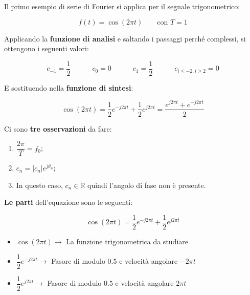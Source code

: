 \documentclass[a4paper]{article}
\begin{document}
	\noindent
	Il primo esempio di serie di Fourier si applica per il segnale trigonometrico:
	
	\begin{equation*}
		f\left(t\right) = \cos\left(2 \pi t\right) \hspace{2em} \text{con } T = 1
	\end{equation*}

	\noindent
	Applicando la \textbf{funzione di analisi} e saltando i passaggi perché complessi, si ottengono i seguenti valori:
	
	\begin{equation*}
		c_{-1} = \dfrac{1}{2} \hspace{3em}
		c_{0} = 0 \hspace{3em}
		c_{1} = \dfrac{1}{2} \hspace{3em}
		c_{i \le -2, i \ge 2} = 0
	\end{equation*}

	\noindent
	E sostituendo nella \textbf{funzione di sintesi}:
	
	\begin{equation*}
		\cos\left(2 \pi t\right) = \dfrac{1}{2} e^{-j 2 \pi t} + \dfrac{1}{2} e^{j 2 \pi t} = \dfrac{e^{j 2 \pi t} + e^{-j 2 \pi t}}{2}
	\end{equation*}

	\noindent
	Ci sono \textbf{tre osservazioni} da fare:
	
	\begin{enumerate}[label=\Roman*.]
		\item $\dfrac{2\pi}{T} = f_{0}$;
		
		\item $c_{n} = |c_{n}| e^{j\theta_{n}}$;
		
		\item In questo caso, $c_{n} \in \mathbb{R}$ quindi l'angolo di fase non è presente.
	\end{enumerate}

	\noindent
	\textbf{Le parti} dell'equazione sono le seguenti:
	
	\begin{equation*}
		\cos{\left(2 \pi t\right)} = \dfrac{1}{2} e^{-j 2 \pi t} + \dfrac{1}{2} e^{j 2 \pi t}
	\end{equation*}

	\begin{itemize}[label=]
		\item $\cos{\left(2 \pi t\right)} \rightarrow$ La funzione trigonometrica da studiare
		
		\item $\dfrac{1}{2} e^{-j 2 \pi t} \rightarrow$ Fasore di modulo $0.5$ e velocità angolare $-2\pi t$
		
		\item $\dfrac{1}{2} e^{j 2 \pi t} \rightarrow$ Fasore di modulo $0.5$ e velocità angolare $2\pi t$
	\end{itemize}
\end{document}
